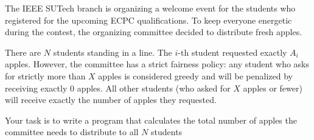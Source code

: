 The IEEE SUTech branch is organizing a welcome event for the students who registered for the upcoming ECPC qualifications. To keep everyone energetic during the contest, the organizing committee decided to distribute fresh apples.

There are $N$ students standing in a line. The $i$-th student requested exactly $A_i$ apples. However, the committee has a strict fairness policy: any student who asks for strictly more than $X$ apples is considered greedy and will be penalized by receiving exactly $0$ apples. All other students (who asked for $X$ apples or fewer) will receive exactly the number of apples they requested.

Your task is to write a program that calculates the total number of apples the committee needs to distribute to all $N$ students
